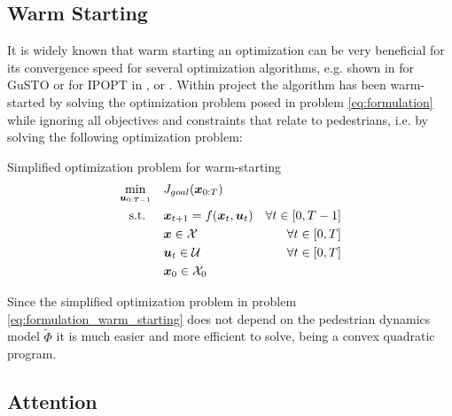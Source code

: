 \subsection{Warm Starting}
\label{text:approach/runtime/warm_starting}
It is widely known that warm starting an optimization can be very beneficial for its convergence speed for several optimization algorithms, e.g. shown in \cite{Banerjee2020} for \ac{GuSTO} or for \ac{IPOPT} in \cite{Shahzad2010}, \cite{John2008} or \cite{Spielberge2019}.
\newline
Within project \project the algorithm has been warm-started by solving the optimization problem posed in problem \ref{eq:formulation} while ignoring all objectives and constraints that relate to pedestrians, i.e. by solving the following optimization problem: \\

\begin{problem}{Simplified \project optimization problem for warm-starting}
\begin{align}
\min_{\boldsymbol{u}_{0:T-1}} \quad & J_{goal}(\boldsymbol{x}_{0:T}) \\
\textrm{s.t. } \quad & \boldsymbol{x}_{t+1} = f(\boldsymbol{x}_t, \boldsymbol{u}_t) & \forall t \in [0, T - 1] \\
& \boldsymbol{x} \in \mathcal{X} & \forall t \in [0, T]\\
& \boldsymbol{u}_t \in \mathcal{U} & \forall t \in [0, T]\\
& \boldsymbol{x}_0 \in \mathcal{X}_0
\end{align} 
\label{eq:formulation_warm_starting}
\end{problem}

Since the simplified optimization problem in problem \ref{eq:formulation_warm_starting} does not depend on the pedestrian dynamics model $\tilde{\Phi}$ it is much easier and more efficient to solve, being a convex quadratic program. \\

\begin{figure}[!ht]
\begin{center}
\end{center}
\label{img:robot_goal_encoding}
\end{figure}


\subsection{Attention}
\label{text:approach/runtime/filtering}
